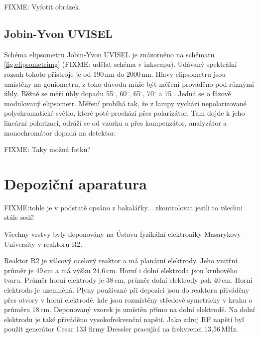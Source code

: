 FIXME: Vyfotit obrázek.


\subsection{Jobin-Yvon UVISEL}
Schéma elipsometru Jobin-Yvon UVISEL je znázorněno na schématu \ref{fig:elipsometrimg} (FIXME: udělat schéma v inkscapu). Udávaný spektrální rozsah tohoto přístroje je od 190\,nm do 2000\,nm. Hlavy elipsometru jsou umístěny na goniometru, z toho důvodu může být měření prováděno pod různými úhly. Běžně se měří úhly dopadu 55$^\circ$, 60$^\circ$, 65$^\circ$, 70$^\circ$ a 75$^\circ$. Jedná se o fázově modulovaný elipsometr. Měření probíhá tak, že z lampy vychází nepolarizované polychromatické světlo, které poté prochází přes polarizátor. Tam dojde k jeho lineární polarizaci, odráží se od vzorku a přes kompenzátor, analyzátor a monochromátor dopadá na detektor.

FIXME: Taky možná fotku?


\section{Depoziční aparatura}
FIXME:tohle je v podstatě opsáno z bakalářky... zkontrolovat jestli to všechni stále sedí!

Všechny vrstvy byly deponovány na Ústavu fyzikální elektroniky Masarykovy University v reaktoru R2. 

Reaktor R2 je válcový ocelový reaktor a má planární elektrody. Jeho vnitřní průměr je 49\,cm a má výšku 24,6\,cm. Horní i dolní elektroda jsou kruhového tvaru. Průměr horní elektrody je 38\,cm, průměr dolní elektrody pak 40\,cm. Horní elektroda je uzemněná. Plyny používané při depozici jsou do reaktoru přiváděny přes otvory v horní elektrodě, kde jsou rozmístěny středově symetricky v kru\-hu o průměru 18\,cm. Deponovaný vzorek je umístěn přímo na dolní elektrodě. Na dolní elektrodu je také přiváděno vysokofrekvenční napětí. Jako zdroj RF napětí byl použit generátor Cesar 133 firmy Dressler pracující na frekvrenci 13,56\,MHz.

